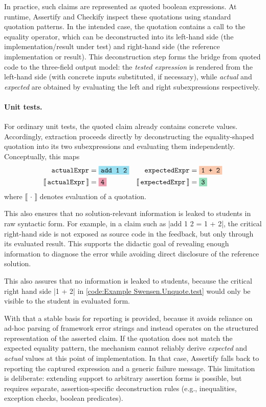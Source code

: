 \skipM In practice, such claims are represented as quoted boolean expressions.
At runtime, Assertify and Checkify inspect these quotations using standard
quotation patterns. In the intended case, the quotation contains a call to the
equality operator, which can be deconstructed into its left-hand side (the
implementation/result under test) and right-hand side (the reference
implementation or result). This deconstruction step forms the bridge from quoted
code to the three-field output model: the \emph{tested expression} is rendered
from the left-hand side (with concrete inputs substituted, if necessary), while
\emph{actual} and \emph{expected} are obtained by evaluating the left and right
subexpressions respectively.


\paragraph{Unit tests.}
\label{par:value-extraction-unit-tests}
For ordinary unit tests, the quoted claim already contains concrete values.
Accordingly, extraction proceeds directly by deconstructing the equality-shaped
quotation into its two subexpressions and evaluating them independently.
Conceptually, this maps
\begin{align*}
\texttt{actualExpr} &= \texttt{\hlbox[metroBlue]{add 1 2}} &
\texttt{expectedExpr} &= \texttt{\hlbox[metroOrange]{1 + 2}}\\
\llbracket\,\texttt{actualExpr}\,\rrbracket &= \texttt{\hlbox[metroRed]{4}} &
\llbracket\,\texttt{expectedExpr}\,\rrbracket &= \texttt{\hlbox[metroGreen]{3}}
\end{align*}
where $\llbracket\,\cdot\,\rrbracket$ denotes evaluation of a quotation.

\skipM This also ensures that no solution-relevant information is leaked to
students in raw syntactic form. For example, in a claim such as
\fsharp|add 1 2 = 1 + 2|, the critical right-hand side is not exposed as source
code in the feedback, but only through its evaluated result. This supports the
didactic goal of revealing enough information to diagnose the error while
avoiding direct disclosure of the reference solution.

\skipM This also assures that no information is leaked to students,
because the critical right hand side \fsharp|1 + 2| in \ref{code:Example
Swensen.Unquote.test} would only be visible to the student in evaluated form.

\skipM With that a stable basis for reporting is provided, because it avoids
reliance on ad-hoc parsing of framework error strings and instead operates on
the structured representation of the asserted claim. If the quotation does not
match the expected equality pattern, the mechanism cannot reliably derive
\emph{expected} and \emph{actual} values at this point of implementation. In
that case, Assertify falls back to reporting the captured expression and a
generic failure message. This limitation is deliberate: extending support to
arbitrary assertion forms is possible, but requires separate, assertion-specific
deconstruction rules (e.g., inequalities, exception checks, boolean predicates).


